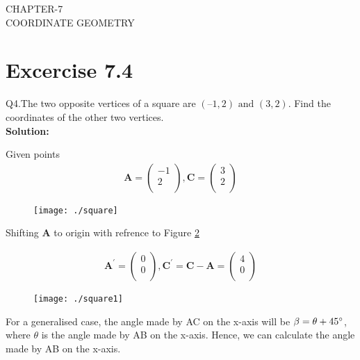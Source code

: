 \documentclass[12pt]{article}
\newcommand{\solution}{\noindent \textbf{Solution: }}
\newcommand{\myvec}[1]{\ensuremath{\begin{pmatrix}#1\end{pmatrix}}}
\let\vec\mathbf
\begin{document}
\begin{center}
\textbf\large{CHAPTER-7 \\ COORDINATE GEOMETRY}

\end{center}
\section*{Excercise 7.4}

Q4.The two opposite vertices of a square are $(–1, 2) \text{ and } (3, 2)$. Find the coordinates of the other two vertices.\\
\solution

Given points 
\begin{align}
\vec{A} = \myvec
{
-1 \\
 2\\
},
\vec{C} = 
\myvec
{
3\\
2\\
}
\end{align}

\begin{figure}[!h]
	\begin{center} 
	    \texttt{[image: ./square]}
	\end{center}
\caption{}
\label{fig:Fig1}
\end{figure}

Shifting $\vec{A}$ to origin with refrence to Figure \ref{fig:Fig2}

\begin{align}
\vec{A^{\prime}} =
\myvec{
0 \\
0\\
},
\vec{C^{\prime}} = \vec{C}-\vec{A} = 
\myvec{
4 \\
0\\
}
\end{align}

\begin{figure}[!h]
	\begin{center} 
	    \texttt{[image: ./square1]}
	\end{center}
\caption{}
\label{fig:Fig2}
\end{figure}

\newpage

For a generalised case, the angle made by AC on the x-axis will be $\beta = \theta + 45\degree$, where $\theta$ is the angle made by AB on the x-axis.
Hence, we can calculate the angle made by AB on the x-axis.\\
\end{document}
